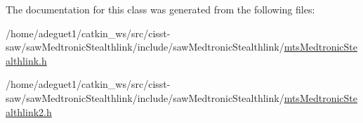 The documentation for this class was generated from the following files\-:\begin{DoxyCompactItemize}
\item 
/home/adeguet1/catkin\-\_\-ws/src/cisst-\/saw/saw\-Medtronic\-Stealthlink/include/saw\-Medtronic\-Stealthlink/\hyperlink{mts_medtronic_stealthlink_8h}{mts\-Medtronic\-Stealthlink.\-h}\item 
/home/adeguet1/catkin\-\_\-ws/src/cisst-\/saw/saw\-Medtronic\-Stealthlink/include/saw\-Medtronic\-Stealthlink/\hyperlink{mts_medtronic_stealthlink2_8h}{mts\-Medtronic\-Stealthlink2.\-h}\end{DoxyCompactItemize}
